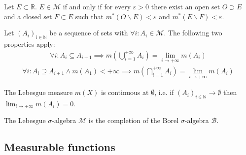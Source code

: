         \begin{theorem}
		Let $E\subset\mathbb{R}$. $E\in\mathcal{M}$ if and only if for every $\varepsilon>0$ there exist an open set $O\supset E$ and a closed set $F\subset E$ such that $m^*(O\backslash E) < \varepsilon$ and $m^*(E\backslash F)<\varepsilon$.
	\end{theorem}
        
        \begin{property}
		Let $(A_i)_{i\in\mathbb{N}}$ be a sequence of sets with $\forall i:A_i\in\mathcal{M}$. The following two properties apply:
        	\begin{gather}
        	    	\forall i: A_i\subseteq A_{i+1} \implies m\left(\bigcup_{i=1}^{+\infty}A_i\right) = \lim_{i\rightarrow+\infty}m(A_i)
		\end{gather}
        	\begin{gather}
        	    	\forall i: A_i\supseteq A_{i+1} \land m(A_1)<+\infty\implies m\left(\bigcap_{i=1}^{+\infty}A_i\right) = \lim_{i\rightarrow+\infty}m(A_i)
		\end{gather}
	\end{property}
        \begin{property}
		The Lebesgue measure $m(X)$ is continuous at $\emptyset$, i.e. if $(A_i)_{i\in\mathbb{N}}\rightarrow\emptyset$ then $\displaystyle\lim_{i\rightarrow+\infty}m(A_i) = 0$.
	\end{property}
        
        \begin{theorem}
		The Lebesgue $\sigma$-algebra $\mathcal{M}$ is the completion of the Borel $\sigma$-algebra $\mathcal{B}$.
	\end{theorem}
        
        
\subsection{Measurable functions}

